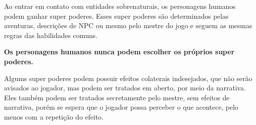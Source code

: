 \documentclass[a4paper,12pt]{book}
\begin{document}
Ao entrar em contato com entidades sobrenaturais, os personagens humanos podem ganhar super poderes. Esses super poderes são determinados pelas aventuras, descrições de NPC ou mesmo pelo mestre do jogo e seguem as mesmas regras das habilidades comuns.

\textbf{Os personagens humanos \textbf{nunca} podem escolher os próprios super poderes.}

Algums super poderes podem possuir efeitos colaterais indesejados, que não serão avisados ao jogador, mas podem ser tratados em aberto, por meio da narrativa. Eles também podem ser tratados secretamente pelo mestre, sem efeitos de narrativa, porém se espera que o jogador possa perceber o que acontece, pelo menos com a repetição do efeito.
\end{document}
